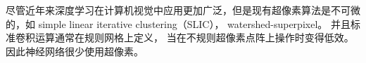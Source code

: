 尽管近年来深度学习在计算机视觉中应用更加广泛，但是现有超像素算法是不可微的，如
simple linear iterative clustering（SLIC）\cite{achanta2012slic}，
watershed-superpixel\cite{Hu2015Watershed}。
并且标准卷积运算通常在规则网格上定义，
当在不规则超像素点阵上操作时变得低效。
因此神经网络很少使用超像素。

\begin{figure}[h]
\centering
{}
\hspace{-2.5mm}
\hspace{-2.5mm}

\end{figure}
